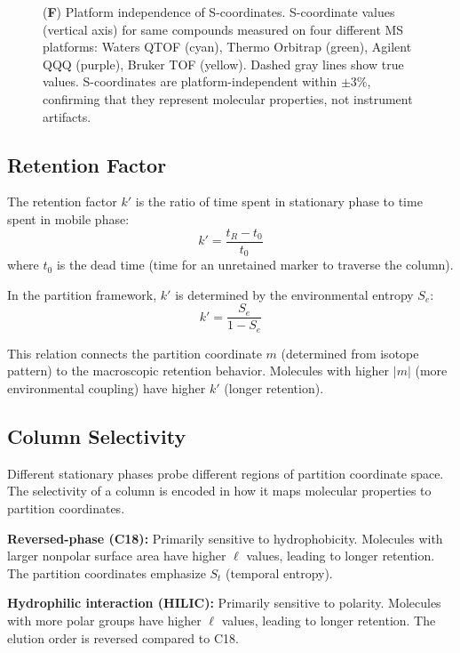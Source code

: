 \documentclass[twocolumn,superscriptaddress,prb,10pt]{revtex4-2}
\begin{document}
\begin{figure}[!htbp]
{(\textbf{F}) Platform independence of S-coordinates. S-coordinate values (vertical axis) for same compounds measured on four different MS platforms: Waters QTOF (cyan), Thermo Orbitrap (green), Agilent QQQ (purple), Bruker TOF (yellow). Dashed gray lines show true values. S-coordinates are platform-independent within $\pm 3\%$, confirming that they represent molecular properties, not instrument artifacts.}
\label{fig:chromatography_validation}
\end{figure}

\subsection{Retention Factor}

The retention factor $k'$ is the ratio of time spent in stationary phase to time spent in mobile phase:
\begin{equation}
k' = \frac{t_R - t_0}{t_0}
\label{eq:retention_factor}
\end{equation}
where $t_0$ is the dead time (time for an unretained marker to traverse the column).

In the partition framework, $k'$ is determined by the environmental entropy $S_e$:
\begin{equation}
k' = \frac{S_e}{1 - S_e}
\label{eq:kprime_se}
\end{equation}

This relation connects the partition coordinate $m$ (determined from isotope pattern) to the macroscopic retention behavior. Molecules with higher $|m|$ (more environmental coupling) have higher $k'$ (longer retention).

\subsection{Column Selectivity}

Different stationary phases probe different regions of partition coordinate space. The selectivity of a column is encoded in how it maps molecular properties to partition coordinates.

\textbf{Reversed-phase (C18):} Primarily sensitive to hydrophobicity. Molecules with larger nonpolar surface area have higher $\ell$ values, leading to longer retention. The partition coordinates emphasize $S_t$ (temporal entropy).

\textbf{Hydrophilic interaction (HILIC):} Primarily sensitive to polarity. Molecules with more polar groups have higher $\ell$ values, leading to longer retention. The elution order is reversed compared to C18.
\end{document}
